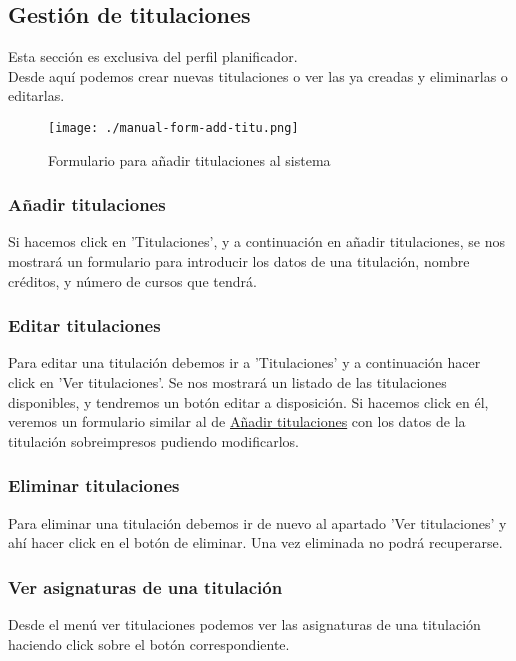 \subsection{Gestión de titulaciones}
Esta sección es exclusiva del perfil planificador.\\

Desde aquí podemos crear nuevas titulaciones o ver las ya creadas y eliminarlas o editarlas.


\begin{figure}[H] 
  \label{manual-form-add-titu} 
	\begin{center}
    \texttt{[image: ./manual-form-add-titu.png]}
  \end{center}
\caption{Formulario para añadir titulaciones al sistema}
\end{figure}

\subsubsection{Añadir titulaciones}
\label{manual-anadir-titulaciones}
Si hacemos click en 'Titulaciones', y a continuación en añadir titulaciones, se nos mostrará un formulario para introducir los datos de una titulación, nombre créditos, y número de cursos que tendrá.

\subsubsection{Editar titulaciones}
Para editar una titulación debemos ir a 'Titulaciones' y a continuación hacer click en 'Ver titulaciones'. Se nos mostrará un listado de las titulaciones disponibles, y tendremos un botón editar a disposición. Si hacemos click en él, veremos un formulario similar al de \hyperref[manual-anadir-titulaciones]{Añadir titulaciones} con los datos de la titulación sobreimpresos pudiendo modificarlos.

\subsubsection{Eliminar titulaciones}
Para eliminar una titulación debemos ir de nuevo al apartado 'Ver titulaciones' y ahí hacer click en el botón de eliminar. Una vez eliminada no podrá recuperarse.

\subsubsection{Ver asignaturas de una titulación}
\label{manual-ver-asignaturas}
Desde el menú ver titulaciones podemos ver las asignaturas de una titulación haciendo click sobre el botón correspondiente.


